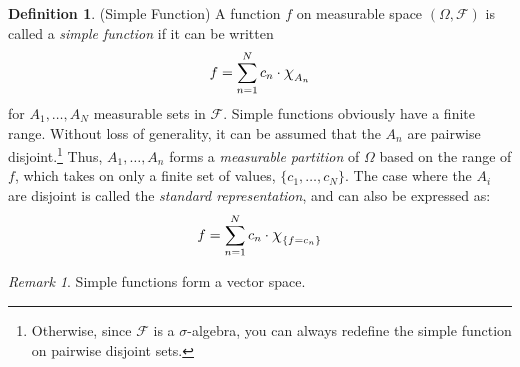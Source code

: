 \documentclass[12pt]{article}
\theoremstyle{plain}
\theoremstyle{definition}
\newtheorem{defn}[thm]{Definition}
\theoremstyle{remark}
\newtheorem*{rmk}{Remark}
\newcommand*{\Chi}{\mbox{\large$\chi$}} %
\newcommand{\sF}{\mathscr{F}}
\begin{document}
\begin{defn}(Simple Function)
A function $f$ on measurable space $(\Omega,\sF)$ is called a
\emph{simple function} if it can be written
\begin{equation}
  \label{simplefn}
  f = \sum^N_{n=1} c_n \cdot \Chi_{A_n}
\end{equation}
for $A_1, \ldots, A_N$ measurable sets in $\sF$. Simple functions
obviously have a finite range. Without loss of generality, it can be
assumed that the $A_n$ are pairwise disjoint.\footnote{%
  Otherwise, since $\sF$ is a $\sigma$-algebra, you can always redefine
  the simple function on pairwise disjoint sets.
}
Thus, $A_1,\ldots,A_n$ forms a \emph{measurable partition} of $\Omega$
based on the range of $f$, which takes on only a finite set of values,
$\{c_1, \ldots, c_N\}$. The case where the $A_i$ are disjoint is called
the \emph{standard representation}, and can also be expressed as:
\begin{align*}
  f
  = \sum^N_{n=1} c_n \cdot \Chi_{\left\{f=c_n \right\}}
\end{align*}
\end{defn}
\begin{rmk} Simple functions form a vector space.
\end{rmk}
\end{document}

